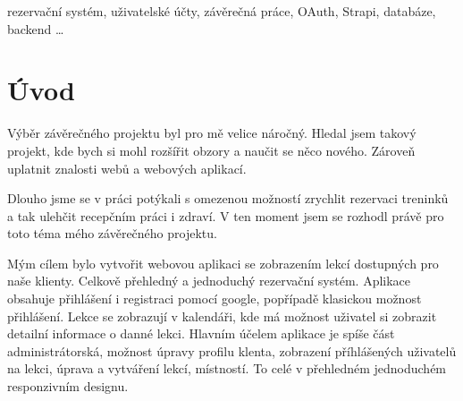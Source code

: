 \documentclass[12pt, a4paper,
openright
]{report}
\begin{document}
	
	\vspace{18pt}
	
	
	\noindent rezervační systém, uživatelské účty, závěrečná práce, OAuth, Strapi, databáze, backend \dots 
	
	\vspace{600pt}


	
	\tableofcontents %


	\chapter*{Úvod}

Výběr závěrečného projektu byl pro mě velice náročný. Hledal jsem takový projekt, kde bych si mohl rozšířit obzory a naučit se něco nového. Zároveň uplatnit znalosti webů a webových aplikací.

 Dlouho jsme se v práci potýkali s omezenou možností zrychlit rezervaci treninků a tak ulehčit recepčním práci i zdraví. V ten moment jsem se rozhodl právě pro toto téma mého závěrečného projektu.

 Mým cílem bylo vytvořit webovou aplikaci se zobrazením lekcí dostupných pro naše klienty. Celkově přehledný a jednoduchý rezervační systém. Aplikace obsahuje přihlášení i registraci pomocí google, popřípadě klasickou možnost přihlášení. Lekce se zobrazují v kalendáři, kde má možnost uživatel si zobrazit detailní informace o danné lekci. Hlavním účelem aplikace je spíše část administrátorská, možnost úpravy profilu klenta, zobrazení příhlášených uživatelů na lekci, úprava a vytváření lekcí, místností. To celé v přehledném jednoduchém responzivním designu.
\end{document}
